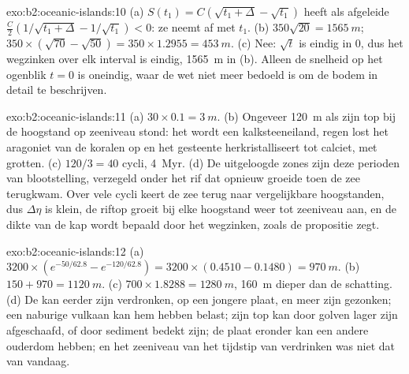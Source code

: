 \begin{solution}{exo:b2:oceanic-islands:10}
(a) $S(t_1) = C(\sqrt{t_1 + \Delta} - \sqrt{t_1})$ heeft als afgeleide $\frac C2(1/\sqrt{t_1 +
\Delta} - 1/\sqrt{t_1}) < 0$: ze neemt af met $t_1$. (b) $350\sqrt{20} = \qty{1565}{m}$; $350\times
(\sqrt{70} - \sqrt{50}) = 350\times1.2955 = \qty{453}{m}$. (c) Nee: $\sqrt t$ is eindig in $0$, dus
het wegzinken over elk interval is eindig, \qty{1565}{m} in (b). Alleen de snelheid op het ogenblik $t = 0$
is oneindig, waar de wet niet meer bedoeld is om de bodem in detail te beschrijven.
\end{solution}

\begin{solution}{exo:b2:oceanic-islands:11}
(a) $30\times0.1 = \qty{3}{m}$. (b) Ongeveer \qty{120}{m} als zijn top bij de hoogstand op zeeniveau
stond: het  wordt een kalksteeneiland, regen lost het aragoniet van de koralen op en het
gesteente herkristalliseert tot calciet, met grotten. (c) $120/3 = 40$ cycli, \qty{4}{Myr}. (d) De uitgeloogde
zones zijn deze perioden van blootstelling, verzegeld onder het rif dat opnieuw groeide toen de zee terugkwam.
Over vele cycli keert de zee terug naar vergelijkbare hoogstanden, dus $\Delta\eta$ is klein, de riftop
groeit bij elke hoogstand weer tot zeeniveau aan, en de dikte van de kap wordt bepaald door het wegzinken, zoals de
propositie zegt.
\end{solution}

\begin{solution}{exo:b2:oceanic-islands:12}
(a) $3200\times(e^{-50/62.8} - e^{-120/62.8}) = 3200\times(0.4510 - 0.1480) = \qty{970}{m}$.
(b) $150 + 970 = \qty{1120}{m}$. (c) $700\times1.8288 = \qty{1280}{m}$, \qty{160}{m} dieper dan de
schatting. (d) De  kan eerder zijn verdronken, op een jongere plaat, en meer zijn gezonken; een naburige
vulkaan kan hem hebben belast; zijn top kan door golven lager zijn afgeschaafd, of door sediment bedekt zijn; de
plaat eronder kan een andere ouderdom hebben; en het zeeniveau van het tijdstip van verdrinken was niet
dat van vandaag.
\end{solution}

